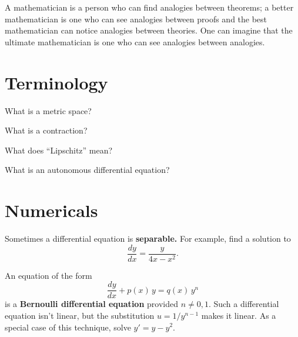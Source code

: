 \documentclass{homework}
\author{Jim Fowler}
\begin{document}
\maketitle

\begin{inspiration}
A mathematician is a person who can find analogies between theorems; a better mathematician is one who can see analogies between proofs and the best mathematician can notice analogies between theories. One can imagine that the ultimate mathematician is one who can see analogies between analogies.
\end{inspiration}

\section{Terminology}

\begin{problem}
  What is a metric space?
\end{problem}

\begin{problem}
  What is a contraction?
\end{problem}

\begin{problem}
  What does ``Lipschitz'' mean?
\end{problem}

\begin{problem}
  What is an autonomous differential equation?
\end{problem}

\section{Numericals}

\begin{problem}
  Sometimes a differential equation is \textbf{separable.}  For example, find a solution to
  \[
    \frac{dy}{dx} = \frac{y}{4x - x^2}.
  \]
\end{problem}

\begin{problem}\label{bernoulli-equation}An equation of the form
  \[
    \frac{dy}{dx} + p(x) \, y = q(x) \, y^n
  \]
  is a \textbf{Bernoulli differential equation} provided $n \neq 0, 1$.  Such a differential equation isn't linear, but the substitution $u = 1/y^{n-1}$ makes it linear.  As a special case of this technique, solve $y' = y - y^2$.
\end{problem}
\end{document}
